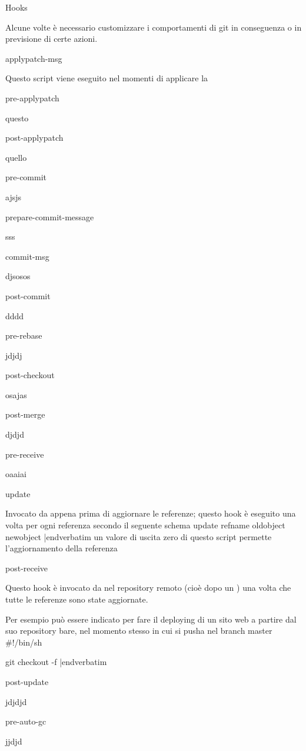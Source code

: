 \capitolo Hooks

Alcune volte \`e necessario customizzare i comportamenti di git in conseguenza o
in previsione di certe azioni.

\sezione applypatch-msg

Questo script viene eseguito nel momenti di applicare la

\sezione pre-applypatch

questo

\sezione post-applypatch

quello

\sezione pre-commit

ajsjs

\sezione prepare-commit-message

sss

\sezione commit-msg

djsosos

\sezione post-commit

dddd

\sezione pre-rebase

jdjdj

\sezione post-checkout

osajas

\sezione post-merge

djdjd

\sezione pre-receive

oaaiai

\sezione update

Invocato da  appena prima di aggiornare le referenze;
questo hook \`e eseguito una volta per ogni referenza secondo il seguente schema
\iniziacode
update refname oldobject newobject
|endverbatim
\finecode
un valore di uscita zero di questo script permette l'aggiornamento della
referenza

\sezione post-receive

Questo hook \`e invocato da  nel repository remoto
(cio\`e dopo un ) una volta che tutte le referenze sono state
aggiornate.

Per esempio pu\`o essere indicato per fare il deploying di un sito web a partire
dal suo repository bare, nel momento stesso in cui si pusha nel branch master
\iniziacode
#!/bin/sh

git checkout -f
|endverbatim
\finecode

\sezione post-update

jdjdjd

\sezione pre-auto-gc

jjdjd
